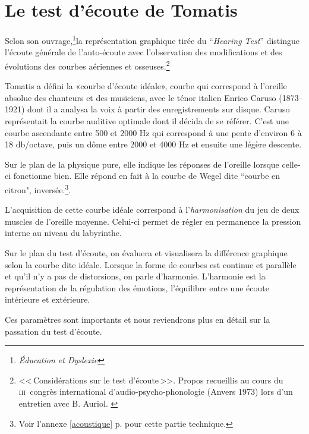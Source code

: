 
\section{Le test d'écoute de Tomatis}


Selon son ouvrage,\footnote{\emph{Éducation et
    Dyslexie}\autocite{tomatis:education}}la représentation graphique tirée du 
 ``\emph{Hearing Test}'' distingue l'écoute générale de l'auto-écoute avec l'observation des modifications et des évolutions des courbes
  aériennes et osseuses.\footnote{<<\,Considérations sur le test d'écoute\,>>. Propos
  	recueillis au cours du \textsc{iii}\ieme\ congrès international
  	d'audio-psycho-phonologie (Anvers 1973) lors d'un entretien
        avec B. Auriol. \autocite{auriol_stress}}





Tomatis a défini la «courbe d'écoute idéale», courbe qui correspond à l'oreille absolue
des chanteurs et des musiciens,  avec  le ténor italien Enrico
Caruso (1873--1921) dont il a analysa la voix à partir des
enregistrements sur disque. Caruso représentait la courbe auditive
optimale dont il décida de se référer. C'est une courbe ascendante entre 500 et 2000
Hz qui correspond à une pente d\textquoteright environ 6 à 18 db/octave,
puis un dôme entre 2000 et 4000 Hz et ensuite une légère descente. 

      Sur le plan de la physique pure, elle indique les réponses de l'oreille
lorsque celle-ci fonctionne bien. Elle répond en fait à la courbe
de Wegel dite ``courbe en citron", inversée.\footnote{
		Voir l'annexe \ref{acoustique} p. \pageref{acoustique}
		 pour cette partie technique.}.

               

L'acquisition de cette courbe idéale correspond à l'\textsl{harmonisation}
du jeu de deux muscles de l'oreille moyenne. Celui-ci 
permet de régler en permanence la pression interne au niveau du
labyrinthe.

Sur le plan du test d'écoute, on évaluera et visualisera la différence
graphique selon la courbe dite 
idéale. Lorsque la forme de
courbes est continue et parallèle et qu'il n'y a pas de distorsions, on parle d'harmonie. L'harmonie
est la représentation de la régulation des émotions, l'équilibre entre
une écoute
intérieure et extérieure.

Ces paramètres sont importants et nous reviendrons plus en détail sur
la passation du test d'écoute.

